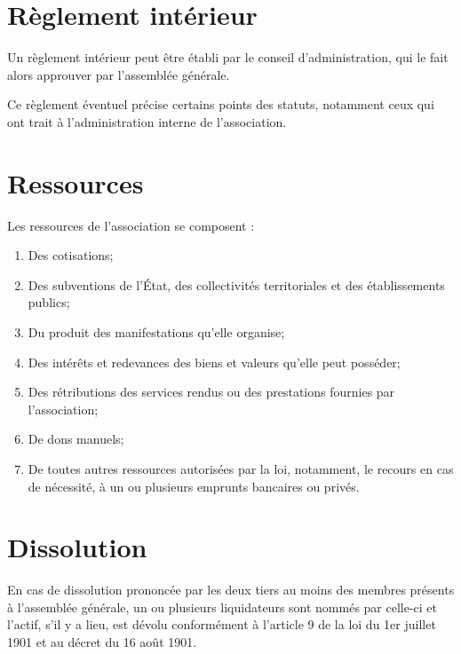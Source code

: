 \documentclass[12pt]{constitution}
\begin{document}
\section{Règlement intérieur}
Un règlement intérieur peut être établi par le conseil d’administration, qui le fait alors approuver par l’assemblée générale.

Ce règlement éventuel précise certains points des statuts, notamment ceux qui ont trait à l’administration interne de l’association.


\section{Ressources}
Les ressources de l’association se composent :
\begin{enumerate}
	\item Des cotisations;
	\item Des subventions de l’État, des collectivités territoriales et des établissements publics;
	\item Du produit des manifestations qu’elle organise;
	\item Des intérêts et redevances des biens et valeurs qu’elle peut posséder;
	\item Des rétributions des services rendus ou des prestations fournies par l'association;
	\item De dons manuels;
	\item De toutes autres ressources autorisées par la loi, notamment, le recours en cas de
	nécessité, à un ou plusieurs emprunts bancaires ou privés.
\end{enumerate}


\section{Dissolution}
En cas de dissolution prononcée par les deux tiers au moins des membres présents à l’assemblée générale, un ou plusieurs liquidateurs sont nommés par celle-ci et l’actif, s’il y a lieu, est dévolu conformément à l’article 9 de la loi du 1er juillet 1901 et au décret du 16 août 1901.
\end{document}
